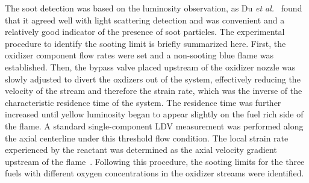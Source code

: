 \documentclass[preprint,3p,times,twocolumn]{elsarticleUS}
\begin{document}
\begin{table}
  \caption{Oxidizer stream composition in mole fractions.}
  \label{table:exp_condition}
  \centering
\end{table}

The soot detection was based on the luminosity observation, as Du \emph{et al.}~\cite{du89} found that it agreed well with light scattering detection and was convenient and a relatively good indicator of the presence of soot particles. The experimental procedure to identify the sooting limit is briefly summarized here. First, the oxidizer component flow rates were set and a non-sooting blue flame was established. Then, the bypass valve placed upstream of the oxidizer nozzle was slowly adjusted to divert the oxdizers out of the system, effectively reducing the velocity of the stream and therefore the strain rate, which was the inverse of the characteristic residence time of the system. The residence time was further increased until yellow luminosity began to appear slightly on the fuel rich side of the flame. A standard single-component LDV measurement was performed along the axial centerline under this threshold flow condition. The local strain rate experienced by the reactant was determined as the axial velocity gradient upstream of the flame~\cite{du89}. Following this procedure, the sooting limits for the three fuels with different oxygen concentrations in the oxidizer streams were identified.
\end{document}
